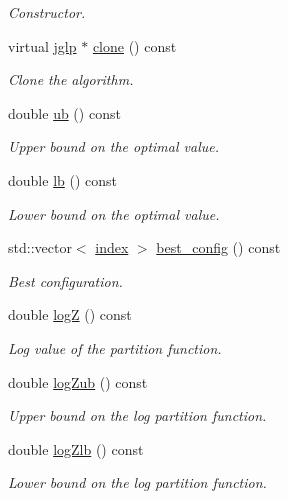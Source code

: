 \begin{DoxyCompactItemize}
\begin{DoxyCompactList}\small\item\em Constructor. \end{DoxyCompactList}\item 
virtual \hyperlink{classmerlin_1_1jglp}{jglp} $\ast$ \hyperlink{classmerlin_1_1jglp_af6e5931262caafec1aab81f6d3001419}{clone} () const 
\begin{DoxyCompactList}\small\item\em Clone the algorithm. \end{DoxyCompactList}\item 
double \hyperlink{classmerlin_1_1jglp_aeb00e60c9df427722f2ff791bdd056d9}{ub} () const 
\begin{DoxyCompactList}\small\item\em Upper bound on the optimal value. \end{DoxyCompactList}\item 
double \hyperlink{classmerlin_1_1jglp_a56a4aa254f07ee4a651bf343ee14d63b}{lb} () const 
\begin{DoxyCompactList}\small\item\em Lower bound on the optimal value. \end{DoxyCompactList}\item 
std\+::vector$<$ \hyperlink{classmerlin_1_1graph_a5cade38832f47248573e921276f122d6}{index} $>$ \hyperlink{classmerlin_1_1jglp_a4e7ff17be5074ce9010fda0154f81fbf}{best\+\_\+config} () const 
\begin{DoxyCompactList}\small\item\em Best configuration. \end{DoxyCompactList}\item 
double \hyperlink{classmerlin_1_1jglp_a2a6a565403cbddd77109a3a6f85e3d35}{log\+Z} () const 
\begin{DoxyCompactList}\small\item\em Log value of the partition function. \end{DoxyCompactList}\item 
double \hyperlink{classmerlin_1_1jglp_a6f964c4acb649a3bf24bd46e8c414113}{log\+Zub} () const 
\begin{DoxyCompactList}\small\item\em Upper bound on the log partition function. \end{DoxyCompactList}\item 
double \hyperlink{classmerlin_1_1jglp_a53e258c9ac8e80e2a99019f350fafe23}{log\+Zlb} () const 
\begin{DoxyCompactList}\small\item\em Lower bound on the log partition function. \end{DoxyCompactList}\item 

\end{DoxyCompactItemize}
